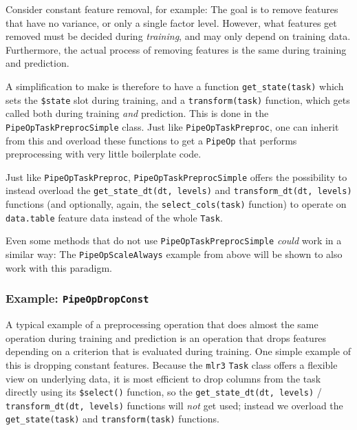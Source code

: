 \documentclass[]{scrbook}
\begin{document}
Consider constant feature removal, for example: The goal is to remove features that have no variance, or only a single factor level.
However, what features get removed must be decided during \emph{training}, and may only depend on training data.
Furthermore, the actual process of removing features is the same during training and prediction.

A simplification to make is therefore to have a function \texttt{get\_state(task)} which sets the \texttt{\$state} slot during training, and a \texttt{transform(task)} function, which gets called both during training \emph{and} prediction.
This is done in the \texttt{PipeOpTaskPreprocSimple} class.
Just like \texttt{PipeOpTaskPreproc}, one can inherit from this and overload these functions to get a \texttt{PipeOp} that performs preprocessing with very little boilerplate code.

Just like \texttt{PipeOpTaskPreproc}, \texttt{PipeOpTaskPreprocSimple} offers the possibility to instead overload the \texttt{get\_state\_dt(dt,\ levels)} and \texttt{transform\_dt(dt,\ levels)} functions (and optionally, again, the \texttt{select\_cols(task)} function) to operate on \texttt{data.table} feature data instead of the whole \texttt{Task}.

Even some methods that do not use \texttt{PipeOpTaskPreprocSimple} \emph{could} work in a similar way: The \texttt{PipeOpScaleAlways} example from above will be shown to also work with this paradigm.

\hypertarget{example-pipeopdropconst}{%
\subsubsection{\texorpdfstring{Example: \texttt{PipeOpDropConst}}{Example: PipeOpDropConst}}\label{example-pipeopdropconst}}

A typical example of a preprocessing operation that does almost the same operation during training and prediction is an operation that drops features depending on a criterion that is evaluated during training.
One simple example of this is dropping constant features.
Because the \texttt{mlr3} \texttt{Task} class offers a flexible view on underlying data, it is most efficient to drop columns from the task directly using its \texttt{\$select()} function, so the \texttt{get\_state\_dt(dt,\ levels)} / \texttt{transform\_dt(dt,\ levels)} functions will \emph{not} get used; instead we overload the \texttt{get\_state(task)} and \texttt{transform(task)} functions.
\end{document}
